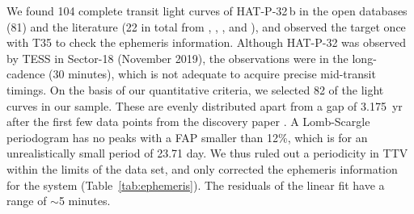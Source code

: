 \documentclass[a4paper,fleqn,usenatbib]{mnras}
\begin{document}
We found 104 complete transit light curves of HAT-P-32\,b in the open databases (81) and the literature (22 in total from \cite{2011ApJ...742...59H}, \cite{2012PASP..124..212S}, \cite{2018MNRAS.474.5485T}, and \cite{2019AJ....157...82W}), and observed the target once with T35 to check the ephemeris information. Although HAT-P-32 was observed by TESS in Sector-18 (November 2019), the observations were in the long-cadence (30 minutes), which is not adequate to acquire precise mid-transit timings. On the basis of our quantitative criteria, we selected 82 of the light curves in our sample. These are evenly distributed apart from a gap of 3.175~yr after the first few data points from the discovery paper \citep{2011ApJ...742...59H}. A Lomb-Scargle periodogram has no peaks with a FAP smaller than 12\%, which is for an unrealistically small period of 23.71 day. We thus ruled out a periodicity in TTV within the limits of the data set, and only corrected the ephemeris information for the system (Table~\ref{tab:ephemeris}). The residuals of the linear fit have a range of $\sim$5 minutes.
\end{document}
